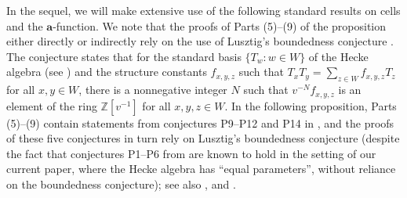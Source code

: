 \documentclass[ALCO,Unicode,published]{cedram}
\newcommand{\Z}{\mathbb{Z}}
\newcommand{\la}{\mathbf{a}}
\newcommand{\inverse}{^{-1}}
\begin{document}
In the sequel, we will make extensive use of the following standard results on cells and the
$\la$-function. We note that the proofs of Parts (5)--(9) of the proposition either directly or
indirectly rely on the use of Lusztig's boundedness conjecture \cite[\S 13.4]{LusztigHecke}. The
conjecture states that for the standard basis $\{T_w:w\in W\}$ of the Hecke algebra (see \cite[\S
2.2]{XuSubregular}) and the structure constants $f_{x,y,z}$ such that $T_xT_y=\sum_{z\in
W}f_{x,y,z}T_z$ for all $x,y\in W$, there is a nonnegative integer $N$ such that $v^{-N}f_{x,y,z}$
is an element of the ring $\Z[v\inverse]$ for all $x,y,z\in W$.  In the following proposition, Parts
(5)--(9) contain statements from conjectures P9--P12 and P14 in \cite[\S 14]{LusztigHecke}, and the
proofs of these five conjectures in turn rely on Lusztig's boundedness conjecture (despite the fact
    that conjectures P1--P6 from \cite[\S 14]{LusztigHecke} are known to hold in the setting of our
current paper, where the Hecke algebra has ``equal parameters'', without reliance on the boundedness
conjecture); see also \cite[\S 15.1]{LusztigHecke}, \cite[\S 14.3]{BonnafeCells} and \cite[Theorem
15.2.5]{BonnafeCells}.
\end{document}

